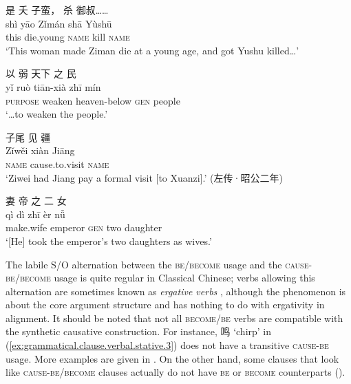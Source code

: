 \documentclass[UTF8, a4paper, oneside, scheme=plain, 12pt]{ctexrep}
\newcommand*{\citepage}[1]{p.~{#1}}
\newcommand*{\term}[1]{\emph{#1}}
\newcommand{\translate}[1]{`#1'}
\newcommand*{\category}[1]{\textsc{#1}}
\begin{document}
\begin{exe}
    \ex\label{ex:grammatical.clause.verbal.argument.causative.synthetic.1}
    \glll 是 夭 子蛮， 杀 御叔…… \\
    shì yāo Zǐmán shā Yùshū \\
    this die.young \category{name} kill \category{name} \\
    \glt\translate{This woman made Ziman die at a young age, and got Yushu killed\dots}
    
    \ex\label{ex:grammatical.clause.verbal.argument.causative.synthetic.2}
    \glll 以 弱 天下 之 民 \\
    yǐ ruò tiān-xià zhī mín \\
    \category{purpose} weaken heaven-below \category{gen} people \\
    \glt\translate{\dots to weaken the people.}

    \ex\label{ex:grammatical.clause.verbal.argument.causative.synthetic.3}
    \glll 子尾 见 疆 \\
    Zǐwěi xiàn Jiāng \\
    \category{name} cause.to.visit \category{name} \\
    \glt\translate{Ziwei had Jiang pay a formal visit [to Xuanzi].} (左传·昭公二年)

    \ex\label{ex:grammatical.clause.verbal.argument.causative.synthetic.4}
    \glll 妻 帝 之 二 女 \\
    qì dì zhī èr nǚ \\
    make.wife emperor \category{gen} two daughter \\
    \glt\translate{[He] took the emperor's two daughters as wives.}
\end{exe}

The labile S/O alternation between the \category{be}/\category{become} usage
and the \category{cause}-\category{be}/\category{become} usage
is quite regular in Classical Chinese;
verbs allowing this alternation are sometimes known as \term{ergative verbs}
\citep[\citepage{378}]{meiguang2018},
although the phenomenon is about the core argument structure and has nothing to do with ergativity in alignment.
It should be noted that not all \category{become}/\category{be} verbs are compatible
with the synthetic causative construction.
For instance, 鸣 \translate{chirp} in (\ref{ex:grammatical.clause.verbal.stative.3})
does not have a transitive \category{cause}-\category{be} usage.
More examples are given in \citet[\citepage{276}]{meiguang2018}.
On the other hand, some clauses that look like \category{cause}-\category{be}/\category{become} clauses
actually do not have \category{be} or \category{become} counterparts 
().
\end{document}
